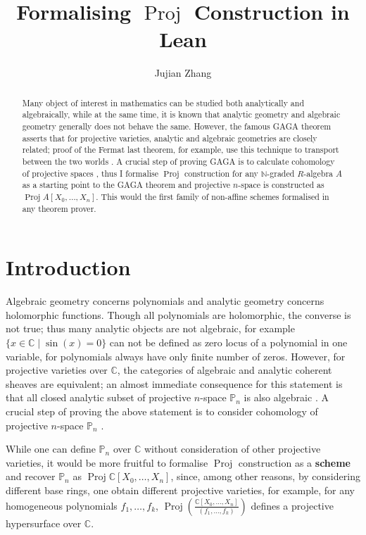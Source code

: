 \documentclass[a4paper,UKenglish,cleveref, autoref, thm-restate]{lipics-v2021}
\title{Formalising $\operatorname{Proj}$ Construction in Lean} %
\author{Jujian Zhang}{Department of Mathematics, Imperial College London \and \url{https://www.imperial.ac.uk/}}{jujian.zhang19@imperial.ac.uk}{https://orcid.org/0000-0001-7340-2703}{Schr\"odinger Scholarship Scheme}
\begin{document}
\maketitle

\begin{abstract}
    Many object of interest in mathematics can be studied both analytically and algebraically, while at the same time, it is known that analytic geometry and algebraic geometry generally does not behave the same. However, the famous GAGA theorem asserts that for projective varieties, analytic and algebraic geometries are closely related; proof of the Fermat last theorem, for example, use this technique to transport between the two worlds \cite{serre1955geometrie}. A crucial step of proving GAGA is to calculate cohomology of projective spaces \cite{neeman2007algebraic,godement1958topologie}, thus I formalise $\operatorname{Proj}$ construction for any $\mathbb{N}$-graded $R$-algebra $A$ as a starting point to the GAGA theorem and projective $n$-space is constructed as $\operatorname{Proj} A[X_0,\dots, X_n]$. This would the first family of non-affine schemes formalised in any theorem prover.
\end{abstract}

\section{Introduction}
Algebraic geometry concerns polynomials and analytic geometry concerns holomorphic functions. Though all polynomials are holomorphic, the converse is not true; thus many analytic objects are not algebraic, for example $\{x \in \mathbb{C} \mid \sin(x) = 0\}$ can not be defined as zero locus of a polynomial in one variable, for polynomials always have only finite number of zeros. However, for projective varieties over $\mathbb{C}$, the categories of algebraic and analytic coherent sheaves are equivalent; an almost immediate consequence for this statement is that all closed analytic subset of projective $n$-space $\mathbb{P}_n$ is also algebraic \cite{serre1955geometrie,chowtheorem}. A crucial step of proving the above statement is to consider cohomology of projective $n$-space $\mathbb{P}_n$  \cite{neeman2007algebraic}. 

While one can define $\mathbb{P}_n$ over $\mathbb{C}$ without consideration of other projective varieties, it would be more fruitful to formalise $\operatorname{Proj}$ construction as a \textbf{scheme} and recover $\mathbb{P}_n$ as $\operatorname{Proj} \mathbb{C}[X_0,\dots, X_n]$, since, among other reasons, by considering different base rings, one obtain different projective varieties, for example, for any homogeneous polynomials $f_1,\dots, f_k$, $\operatorname{Proj}\left(\frac{\mathbb{C}[X_0,\dots,X_n]}{(f_1,\dots,f_k)}\right)$ defines a projective hypersurface over $\mathbb{C}$.
\end{document}
